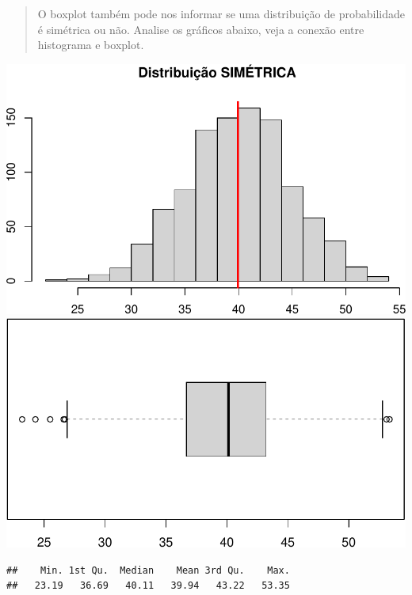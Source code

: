 \documentclass[
]{book}
\begin{document}
\begin{quote}
O boxplot também pode nos informar se uma distribuição de probabilidade é simétrica ou não. Analise os gráficos abaixo, veja a conexão entre histograma e boxplot.
\end{quote}

\includegraphics{Livro-Estatistica+R_files/figure-latex/unnamed-chunk-21-1.pdf} \includegraphics{Livro-Estatistica+R_files/figure-latex/unnamed-chunk-21-2.pdf}

\begin{verbatim}
##    Min. 1st Qu.  Median    Mean 3rd Qu.    Max. 
##   23.19   36.69   40.11   39.94   43.22   53.35
\end{verbatim}
\end{document}
